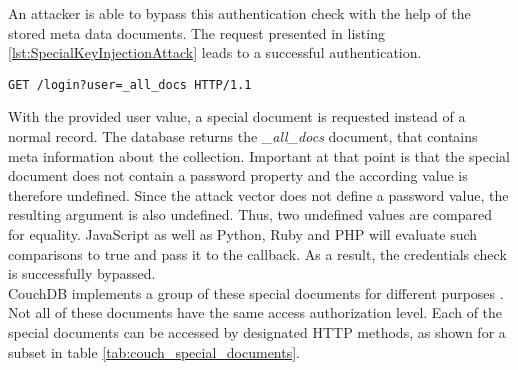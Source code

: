An attacker is able to bypass this authentication check with the help of the stored meta data documents. The request presented in listing \ref{lst:SpecialKeyInjectionAttack} leads to a successful authentication.
 
\begin{lstlisting}[caption={Attack vector against CouchDB for special key injection via the query-string parameter}, label={lst:SpecialKeyInjectionAttack}]
GET /login?user=_all_docs HTTP/1.1
\end{lstlisting}

With the provided user value, a special document is requested instead of a normal record. The database returns the \emph{\_all\_docs} document, that contains meta information about the collection. Important at that point is that the special document does not contain a password property and the according value is therefore undefined. Since the attack vector does not define a password value, the resulting argument is also undefined. Thus, two undefined values are compared for equality. JavaScript as well as Python, Ruby and PHP will evaluate such comparisons to true and pass it to the callback. As a result, the credentials check is successfully bypassed.\\

CouchDB implements a group of these special documents for different purposes \cite{ASF2016}. Not all of these documents have the same access authorization level. Each of the special documents can be accessed by designated HTTP methods, as shown for a subset in table \ref{tab:couch_special_documents}. \\

